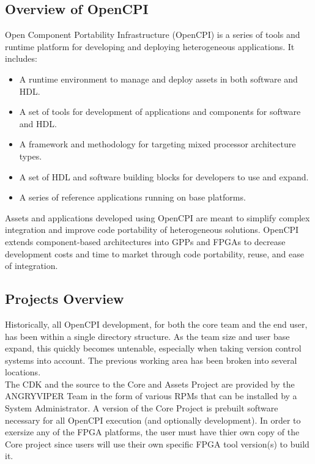 \subsection{Overview of OpenCPI}
Open Component Portability Infrastructure (OpenCPI) is a series of tools and runtime platform for developing and deploying heterogeneous applications. It includes:
\begin{itemize}
\item A runtime environment to manage and deploy assets in both software and HDL.
\item A set of tools for development of applications and components for software and HDL.
\item A framework and methodology for targeting mixed processor architecture types.
\item A set of HDL and software building blocks for developers to use and expand.
\item A series of reference applications running on base platforms.
\end{itemize}

Assets and applications developed using OpenCPI are meant to simplify complex integration and improve code portability of heterogeneous solutions. OpenCPI extends component-based architectures into GPPs and FPGAs to decrease development costs and time to market through code portability, reuse, and ease of integration.

\subsection{Projects Overview}
Historically, all OpenCPI development, for both the core team and the end user, has been within a single directory structure. As the team size and user base expand, this quickly becomes untenable, especially when taking version control systems into account. The previous working area has been broken into several locations. \\ 

The CDK and the source to the Core and Assets Project are provided by the ANGRYVIPER Team in the form of various RPMs that can be installed by a System Administrator. A version of the Core Project is prebuilt software necessary for all OpenCPI execution (and optionally development).  In order to exersize any of the FPGA platforms, the user must have thier own copy of the Core project since users will use their own specific FPGA tool version(s) to build it.


